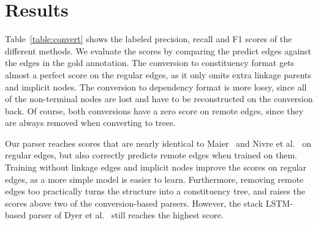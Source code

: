 \documentclass[11pt]{article}
\newcommand{\tabref}[1]{Table~\ref{#1}}
\begin{document}
\section{Results}

\tabref{table:convert} shows the labeled precision, recall and F1 scores of the different methods. We evaluate the scores by comparing the predict edges against the edges in the gold annotation.
The conversion to constituency format gets almost a perfect score on the regular edges, as it only omits extra linkage parents and implicit nodes. The conversion to dependency format is more lossy, since all of the non-terminal nodes are lost and have to be reconstructed on the conversion back. Of course, both conversions have a zero score on remote edges, since they are always removed when converting to trees.

Our parser reaches scores that are nearly identical to Maier~ and Nivre et al.~ on regular edges, but also correctly predicts remote edges when trained on them.
Training without linkage edges and implicit nodes improve the scores on regular edges, as a more simple model is easier to learn. Furthermore, removing remote edges too practically turns the structure into a constituency tree, and raises the scores above two of the conversion-based parsers. However, the stack LSTM-based parser of Dyer et al.~ still reaches the highest score.
\end{document}
